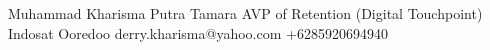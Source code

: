 %
%
%


\begin{referees}
		{Muhammad Kharisma Putra Tamara}
		{AVP of Retention (Digital Touchpoint)}
		{Indosat Ooredoo}
		{derry.kharisma@yahoo.com}
		{+6285920694940}
	
\end{referees}